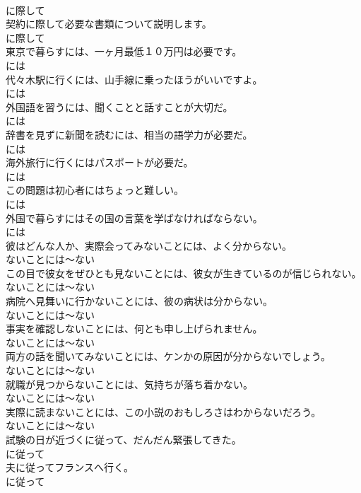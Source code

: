 \documentclass[8pt]{extreport}
\begin{document}
\begin{CJK}{UTF8}{min}
\\	に際して	
\\	契約に際して必要な書類について説明します。	
\\	に際して	
\\	東京で暮らすには、一ヶ月最低１０万円は必要です。	
\\	には	
\\	代々木駅に行くには、山手線に乗ったほうがいいですよ。	
\\	には	
\\	外国語を習うには、聞くことと話すことが大切だ。	
\\	には	
\\	辞書を見ずに新聞を読むには、相当の語学力が必要だ。	
\\	には	
\\	海外旅行に行くにはパスポートが必要だ。	
\\	には	
\\	この問題は初心者にはちょっと難しい。	
\\	には	
\\	外国で暮らすにはその国の言葉を学ばなければならない。	
\\	には	
\\	彼はどんな人か、実際会ってみないことには、よく分からない。	
\\	ないことには～ない	
\\	この目で彼女をぜひとも見ないことには、彼女が生きているのが信じられない。	
\\	ないことには～ない	
\\	病院へ見舞いに行かないことには、彼の病状は分からない。	
\\	ないことには～ない	
\\	事実を確認しないことには、何とも申し上げられません。	
\\	ないことには～ない	
\\	両方の話を聞いてみないことには、ケンかの原因が分からないでしょう。	
\\	ないことには～ない	
\\	就職が見つからないことには、気持ちが落ち着かない。	
\\	ないことには～ない	
\\	実際に読まないことには、この小説のおもしろさはわからないだろう。	
\\	ないことには～ない	
\\	試験の日が近づくに従って、だんだん緊張してきた。	
\\	に従って	
\\	夫に従ってフランスへ行く。	
\\	に従って	

\end{CJK}
\end{document}
